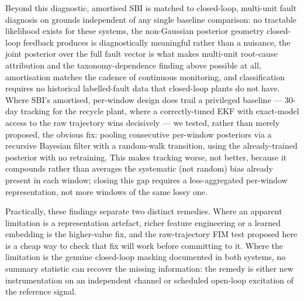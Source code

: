 \documentclass[aps,pre,twocolumn,superscriptaddress]{revtex4-2}
\begin{document}
Beyond this diagnostic, amortised SBI is matched to closed-loop, multi-unit
fault diagnosis on grounds independent of any single baseline comparison:
no tractable likelihood exists for these systems, the non-Gaussian
posterior geometry closed-loop feedback produces is diagnostically
meaningful rather than a nuisance, the joint posterior over the full fault
vector is what makes multi-unit root-cause attribution and the
taxonomy-dependence finding above possible at all, amortisation matches the
cadence of continuous monitoring, and classification requires no
historical labelled-fault data that closed-loop plants do not have. Where
SBI's amortised, per-window design does trail a privileged baseline ---
30-day tracking for the recycle plant, where a correctly-tuned EKF with
exact-model access to the raw trajectory wins decisively --- we tested,
rather than merely proposed, the obvious fix: pooling consecutive
per-window posteriors via a recursive Bayesian filter with a random-walk
transition, using the already-trained posterior with no retraining. This
makes tracking worse, not better, because it compounds rather than
averages the systematic (not random) bias already present in each window;
closing this gap requires a less-aggregated per-window representation, not
more windows of the same lossy one.

Practically, these findings separate two distinct remedies. Where an
apparent limitation is a representation artefact, richer feature engineering
or a learned embedding is the higher-value fix, and the raw-trajectory FIM
test proposed here is a cheap way to check that fix will work before
committing to it. Where the limitation is the genuine closed-loop masking
documented in both systems, no summary statistic can recover the missing
information: the remedy is either new instrumentation on an independent
channel or scheduled open-loop excitation of the reference signal.


% 

\end{document}

